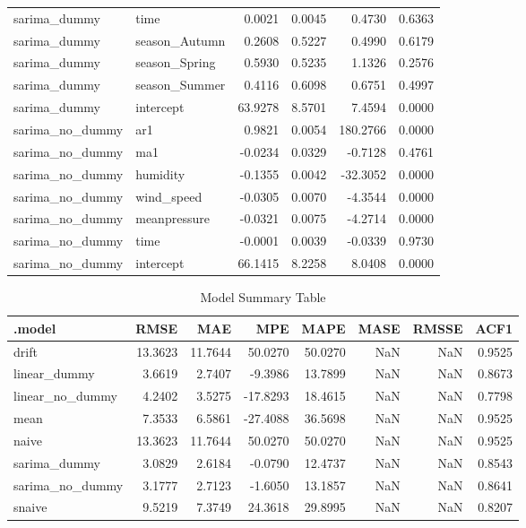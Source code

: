 \begin{table}[!h]
\begin{tabular}[t]{llrrrr}
    sarima\_dummy & time & 0.0021 & 0.0045 & 0.4730 & 0.6363\\
    sarima\_dummy & season\_Autumn & 0.2608 & 0.5227 & 0.4990 & 0.6179\\
    sarima\_dummy & season\_Spring & 0.5930 & 0.5235 & 1.1326 & 0.2576\\
    sarima\_dummy & season\_Summer & 0.4116 & 0.6098 & 0.6751 & 0.4997\\
    sarima\_dummy & intercept & 63.9278 & 8.5701 & 7.4594 & 0.0000\\
    \addlinespace
    sarima\_no\_dummy & ar1 & 0.9821 & 0.0054 & 180.2766 & 0.0000\\
    sarima\_no\_dummy & ma1 & -0.0234 & 0.0329 & -0.7128 & 0.4761\\
    sarima\_no\_dummy & humidity & -0.1355 & 0.0042 & -32.3052 & 0.0000\\
    sarima\_no\_dummy & wind\_speed & -0.0305 & 0.0070 & -4.3544 & 0.0000\\
    sarima\_no\_dummy & meanpressure & -0.0321 & 0.0075 & -4.2714 & 0.0000\\
    \addlinespace
    sarima\_no\_dummy & time & -0.0001 & 0.0039 & -0.0339 & 0.9730\\
    sarima\_no\_dummy & intercept & 66.1415 & 8.2258 & 8.0408 & 0.0000\\
    \bottomrule
    \end{tabular}
\end{table}

\begin{table}[!h]
    \centering
    \caption{Model Summary Table}
    \centering
    \begin{tabular}[t]{lrrrrrrr}
    \toprule
    .model & RMSE & MAE & MPE & MAPE & MASE & RMSSE & ACF1\\
    \midrule
    drift & 13.3623 & 11.7644 & 50.0270 & 50.0270 & NaN & NaN & 0.9525\\
    linear\_dummy & 3.6619 & 2.7407 & -9.3986 & 13.7899 & NaN & NaN & 0.8673\\
    linear\_no\_dummy & 4.2402 & 3.5275 & -17.8293 & 18.4615 & NaN & NaN & 0.7798\\
    mean & 7.3533 & 6.5861 & -27.4088 & 36.5698 & NaN & NaN & 0.9525\\
    naive & 13.3623 & 11.7644 & 50.0270 & 50.0270 & NaN & NaN & 0.9525\\
    \addlinespace
    sarima\_dummy & 3.0829 & 2.6184 & -0.0790 & 12.4737 & NaN & NaN & 0.8543\\
    sarima\_no\_dummy & 3.1777 & 2.7123 & -1.6050 & 13.1857 & NaN & NaN & 0.8641\\
    snaive & 9.5219 & 7.3749 & 24.3618 & 29.8995 & NaN & NaN & 0.8207\\
    \bottomrule
    \end{tabular}
\end{table}